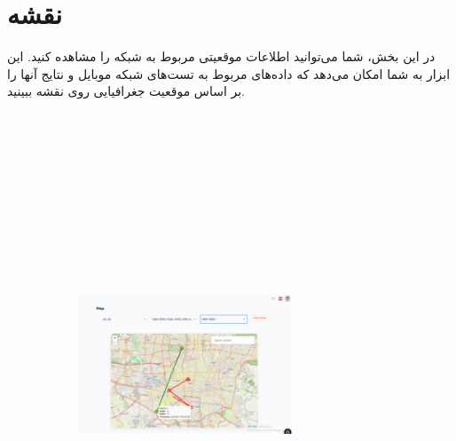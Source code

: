 \documentclass{report}
\begin{document}
\section{نقشه}
در این بخش، شما می‌توانید اطلاعات موقعیتی مربوط به شبکه را مشاهده کنید. این ابزار به شما امکان می‌دهد که داده‌های مربوط به تست‌های شبکه موبایل و نتایج آنها را بر اساس موقعیت جغرافیایی روی نقشه ببینید.
\begin{figure}[h]
	\centering
	\begin{subfigure}[b]{0.4\textwidth}\centering
		\includegraphics[width=0.7\textwidth,height=15cm,keepaspectratio]{Pic/map}
		\label{fig:map}
	\end{subfigure}
	\begin{subfigure}[b]{0.4\textwidth}\centering

\end{subfigure}
\end{figure}
\end{document}
